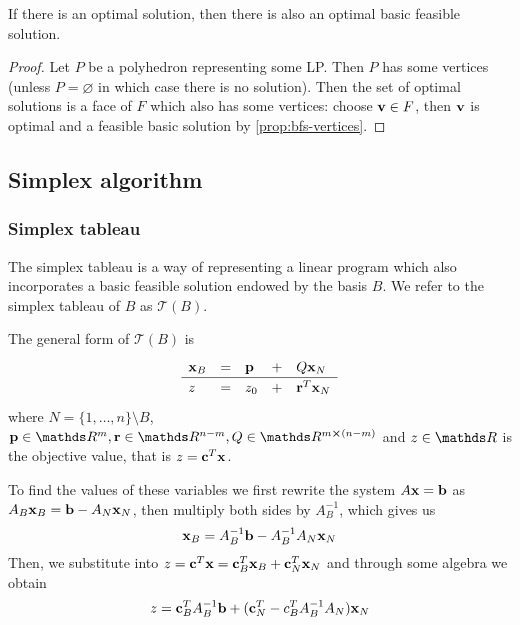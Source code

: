 \documentclass[12pt]{extarticle}
\renewcommand{\vec}[1]{\bvec{#1}}
\begin{document}
\begin{corollary}{}{}
	If there is an optimal solution, then there is also an optimal basic feasible solution.
\end{corollary}
\begin{proof}
	Let $P$ be a polyhedron representing some LP. Then $P$ has some vertices (unless $P = \varnothing$
	in which case there is no solution).
	Then the set of optimal solutions is a face of $F$ which also has some vertices:
	choose $\vec v \in F$, then $\vec v$ is optimal and a feasible basic solution by
	\cref{prop:bfs-vertices}.
\end{proof}

\subsection{Simplex algorithm}

\subsubsection{Simplex tableau}

The simplex tableau is a way of representing a linear program which also incorporates a basic
feasible solution endowed by the basis $B$.
We refer to the simplex tableau of $B$ as $\mathcal T(B)$.

The general form of $\mathcal T(B)$ is
\begin{equation}
	\def\arraystretch{1.2}
	\begin{array}{lllll}
		\vec x_B & = & \vec p & + & Q \vec x_N        \\
		\hline
		z        & = & z_0    & + & \vec r^T \vec x_N
	\end{array}
\end{equation}
where $N = \{1, \dots, n\} \setminus B$, $\vec p \in \R^m, \vec r \in \R^{n-m}, Q \in \R^{m
		\cross(n-m)}$ and $z \in \R$ is the objective value, that is $z = \vec c^T \vec x$.

To find the values of these variables we first rewrite the system $A\vec x = \vec b$ as
$A_B \vec x_B = \vec b - A_N \vec x_N$, then multiply both sides by $A_B^{-1}$, which gives us
\begin{equation}
	\vec x_B = A_B^{-1} \vec b - A_B^{-1} A_N \vec x_N
\end{equation}
Then, we substitute into $z = \vec c^T \vec x = \vec c^T_B \vec x_B + \vec c^T_N \vec x_N$
and through some algebra we obtain
\begin{equation}
	z = \vec c^T_B A^{-1}_B \vec b + (\vec c^T_N - c^T_B A_B^{-1} A_N) \vec x_N
\end{equation}
\end{document}
